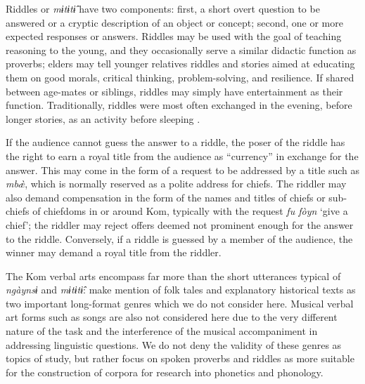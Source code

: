 \documentclass[output=paper,colorlinks,citecolor=brown
]{langscibook}
\begin{document}
Riddles or \textit{mɨtɨtɨ̂} have two components: first, a short overt question to be answered or a cryptic description of an object or concept; second, one or more expected responses or answers.
%
Riddles may be used with the goal of teaching reasoning to the young, and they occasionally serve a similar didactic function as proverbs; elders may tell younger relatives riddles and stories aimed at educating them on good morals, critical thinking, problem-solving, and resilience. 
%
If shared between age-mates or siblings, riddles may simply have entertainment as their function. 
%
Traditionally, riddles were most often exchanged in the evening, before longer stories, as an activity before sleeping \citep{jickngam-generic}. 

If the audience cannot guess the answer to a riddle, the poser of the riddle has the right to earn a royal title from the audience as ``currency'' in exchange for the answer. 
This may come in the form of a request to be addressed by a title such as \textit{mbæ̀}, which is normally reserved as a polite address for chiefs.
The riddler may also demand compensation in the form of the names and titles of chiefs or sub-chiefs of chiefdoms in or around Kom, typically with the request \textit{fu fòyn} `give a chief'; the riddler may reject offers 
deemed not prominent enough for the answer to the riddle. 
Conversely, if a riddle is guessed by a member of the audience, the winner may demand a royal title from the riddler. 

The Kom verbal arts encompass far more than the short utterances typical of \textit{ngàynsɨ} and \textit{mɨtɨtɨ̂}: 
\citet{jickngam-generic} make mention of folk tales and explanatory historical texts as two important long-format genres which we do not consider here. 
Musical verbal art forms such as songs are also not considered here due to the very different nature of the task and the interference of the musical accompaniment in addressing linguistic questions. 
We do not deny the validity of these genres as topics of study, but rather focus on spoken proverbs and riddles as more suitable for the construction of corpora for research into phonetics and phonology. 
\end{document}
